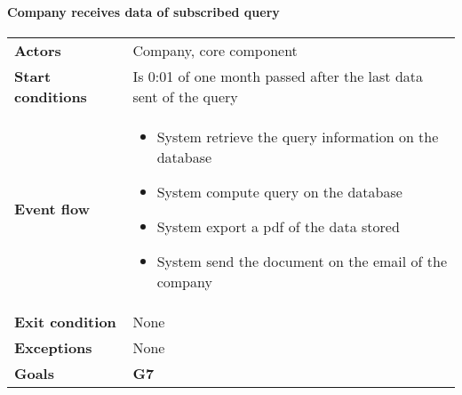 \paragraph{Company receives data of subscribed query}
\begin{center}
\begin{table}[H]
\centering
\begin{tabular}{l|l}
\textbf{Actors} & 
Company, core component
 \\
\textbf{Start conditions} & Is 0:01 of one month passed after the last data sent of the query \\
\textbf{Event flow}  & \begin{minipage}[t]{0.7\textwidth}
    \begin{itemize}
       \item System retrieve the query information on the database

        \item System compute query on the database
        \item System export a pdf of the data stored
        \item System send the document on the email of the company 


    \end{itemize}
    
\end{minipage} \\
\textbf{Exit condition} & None \\
\textbf{Exceptions} & None \\
\textbf{Goals} & \textbf{G7} 
\end{tabular}

\end{table}
\end{center}











